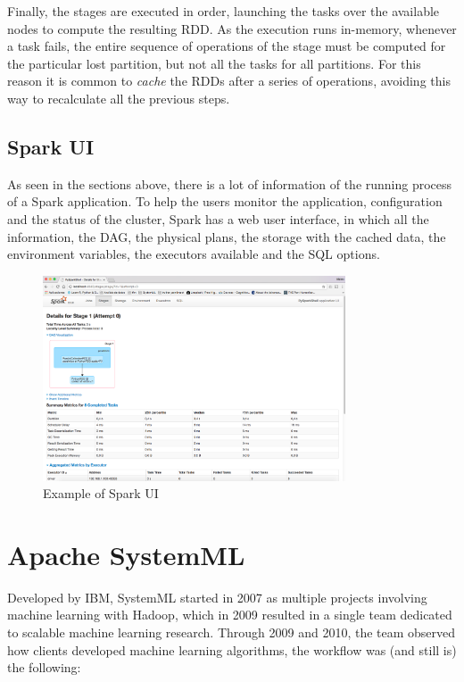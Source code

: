 \documentclass[11pt]{book} %
\begin{document}
          Finally, the stages are executed in order, launching the tasks over the available nodes to compute the resulting RDD. As the execution runs in-memory, whenever a task fails, the entire sequence of operations of the stage must be computed for the particular lost partition, but not all the tasks for all partitions. For this reason it is common to \emph{cache} the RDDs after a series of operations, avoiding this way to recalculate all the previous steps.

      \subsection{Spark UI}

        As seen in the sections above, there is a lot of information of the running process of a Spark application. To help the users monitor the application, configuration and the status of the cluster, Spark has a web user interface, in which all the information, the DAG, the physical plans, the storage with the cached data, the environment variables, the executors available and the SQL options.

        \begin{figure}[!ht]
          \centering
          \includegraphics[width=0.8\textwidth]{Spark_ui.png}
          \caption{Example of Spark UI}
          \label{img:Spark_ui}
        \end{figure}

\newpage

  \section{Apache SystemML}

    Developed by IBM, SystemML started in 2007 as multiple projects involving machine learning with Hadoop, which in 2009 resulted in a single team dedicated to scalable machine learning research. Through 2009 and 2010, the team observed how clients developed machine learning algorithms, the workflow was (and still is) the following:
\end{document}
